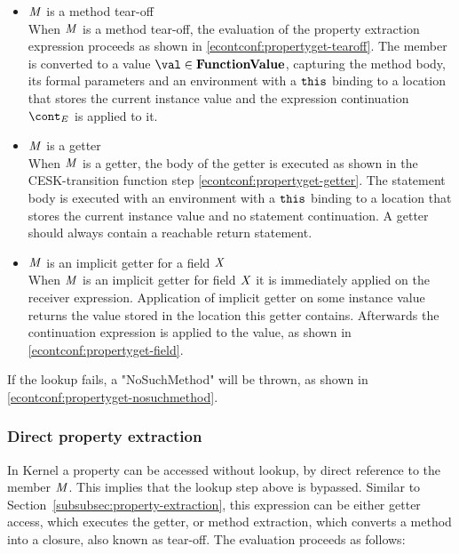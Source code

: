 \documentclass[a4paper,oneside]{article}
\begin{document}
\begin{itemize}
    \item $\mathit{M}$ is a method tear-off\\
        When $\mathit{M}$ is a method tear-off, the evaluation of the property extraction expression proceeds as shown in \eqref{econtconf:propertyget-tearoff}.
        The member is converted to a value $\val \in \dfunval$, capturing the method body, its formal parameters and an environment with a $\tt{this}$ binding to a location that stores the current instance value and the expression continuation $\econt$ is applied to it.

    \item $\mathit{M}$ is a getter\\
        When $\mathit{M}$ is a getter, the body of the getter is executed as shown in the CESK-transition function step \eqref{econtconf:propertyget-getter}.
        The statement body is executed with an environment with a $\tt{this}$ binding to a location that stores the current instance value and no statement continuation.
        A getter should always contain a reachable return statement.

    \item $\mathit{M}$ is an implicit getter for a field $\mathit{X}$\\
        When $\mathit{M}$ is an implicit getter for field $\mathit{X}$ it is immediately applied on the receiver expression.
        Application of implicit getter on some instance value returns the value stored in the location this getter contains.
        Afterwards the continuation expression is applied to the value, as shown in \eqref{econtconf:propertyget-field}.

\end{itemize}

If the lookup fails, a "NoSuchMethod" will be thrown, as shown in \eqref{econtconf:propertyget-nosuchmethod}.


\subsubsection{Direct property extraction}
\label{subsubsec:direct-property-extraction}

In Kernel a property can be accessed without lookup, by direct reference to the member $\mathit{M}$.
This implies that the lookup step above is bypassed.
Similar to Section~\ref{subsubsec:property-extraction}, this expression can be either getter access, which executes the getter, or method extraction, which converts a method into a closure, also known as tear-off.
The evaluation proceeds as follows:
\end{document}
